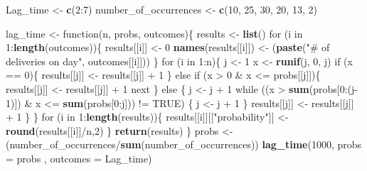\documentclass[]{article}
\newenvironment{Shaded}{\begin{snugshade}}{\end{snugshade}}
\newcommand{\KeywordTok}[1]{\textcolor[rgb]{0.13,0.29,0.53}{\textbf{{#1}}}}
\newcommand{\DataTypeTok}[1]{\textcolor[rgb]{0.13,0.29,0.53}{{#1}}}
\newcommand{\DecValTok}[1]{\textcolor[rgb]{0.00,0.00,0.81}{{#1}}}
\newcommand{\StringTok}[1]{\textcolor[rgb]{0.31,0.60,0.02}{{#1}}}
\newcommand{\OtherTok}[1]{\textcolor[rgb]{0.56,0.35,0.01}{{#1}}}
\newcommand{\NormalTok}[1]{{#1}}
\begin{document}
\begin{Shaded}
\begin{Highlighting}[]
\NormalTok{Lag_time <-}\StringTok{ }\KeywordTok{c}\NormalTok{(}\DecValTok{2}\NormalTok{:}\DecValTok{7}\NormalTok{)}
\NormalTok{number_of_occurrences <-}\StringTok{ }\KeywordTok{c}\NormalTok{(}\DecValTok{10}\NormalTok{, }\DecValTok{25}\NormalTok{, }\DecValTok{30}\NormalTok{, }\DecValTok{20}\NormalTok{, }\DecValTok{13}\NormalTok{, }\DecValTok{2}\NormalTok{)}

\NormalTok{lag_time <-}\StringTok{ }\NormalTok{function(n, probs, outcomes)\{}
        \NormalTok{results <-}\StringTok{ }\KeywordTok{list}\NormalTok{()}
        \NormalTok{for (i in }\DecValTok{1}\NormalTok{:}\KeywordTok{length}\NormalTok{(outcomes))\{}
         \NormalTok{results[[i]] <-}\StringTok{ }\DecValTok{0}
         \KeywordTok{names}\NormalTok{(results[[i]]) <-}\StringTok{ }\NormalTok{(}\KeywordTok{paste}\NormalTok{(}\StringTok{"# of deliveries on day"}\NormalTok{, outcomes[[i]]))}
        \NormalTok{\}}
     \NormalTok{for (i in }\DecValTok{1}\NormalTok{:n)\{}
       \NormalTok{j <-}\StringTok{ }\DecValTok{1} 
       \NormalTok{x <-}\StringTok{ }\KeywordTok{runif}\NormalTok{(j, }\DecValTok{0}\NormalTok{, j)}
       \NormalTok{if (x ==}\StringTok{ }\DecValTok{0}\NormalTok{)\{}
        \NormalTok{results[[j]] <-}\StringTok{ }\NormalTok{results[[j]] +}\StringTok{ }\DecValTok{1}
       \NormalTok{\} else if (x >}\StringTok{ }\DecValTok{0} \NormalTok{&}\StringTok{ }\NormalTok{x <=}\StringTok{ }\NormalTok{probs[[j]])\{}
        \NormalTok{results[[j]] <-}\StringTok{ }\NormalTok{results[[j]] +}\StringTok{ }\DecValTok{1}
        \NormalTok{next}
       \NormalTok{\} else \{}
       \NormalTok{j <-}\StringTok{ }\NormalTok{j +}\StringTok{ }\DecValTok{1}
       \NormalTok{while ((x >}\StringTok{ }\KeywordTok{sum}\NormalTok{(probs[}\DecValTok{0}\NormalTok{:(j}\DecValTok{-1}\NormalTok{)]) &}\StringTok{ }\NormalTok{x <=}\StringTok{ }\KeywordTok{sum}\NormalTok{(probs[}\DecValTok{0}\NormalTok{:j])) !=}\StringTok{ }\OtherTok{TRUE}\NormalTok{) \{}
       \NormalTok{j <-}\StringTok{ }\NormalTok{j +}\StringTok{ }\DecValTok{1}
       \NormalTok{\}}
       \NormalTok{results[[j]] <-}\StringTok{ }\NormalTok{results[[j]] +}\StringTok{ }\DecValTok{1}
       \NormalTok{\}}
     \NormalTok{\}}
    \NormalTok{for (i in }\DecValTok{1}\NormalTok{:}\KeywordTok{length}\NormalTok{(results))\{}
     \NormalTok{results[[i]][[}\StringTok{"probability"}\NormalTok{]] <-}\StringTok{ }\KeywordTok{round}\NormalTok{(results[[i]]/n,}\DecValTok{2}\NormalTok{)}
    \NormalTok{\}}
  \KeywordTok{return}\NormalTok{(results)}
\NormalTok{\}}
\NormalTok{probs <-}\StringTok{ }\NormalTok{(number_of_occurrences/}\KeywordTok{sum}\NormalTok{(number_of_occurrences))}
\KeywordTok{lag_time}\NormalTok{(}\DecValTok{1000}\NormalTok{, }\DataTypeTok{probs =} \NormalTok{probs , }\DataTypeTok{outcomes =} \NormalTok{Lag_time)}
\end{Highlighting}
\end{Shaded}
\end{document}
